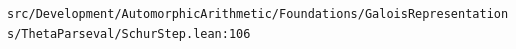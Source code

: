 \nolinkurl{src/Development/AutomorphicArithmetic/Foundations/GaloisRepresentations/ThetaParseval/SchurStep.lean:106}%
